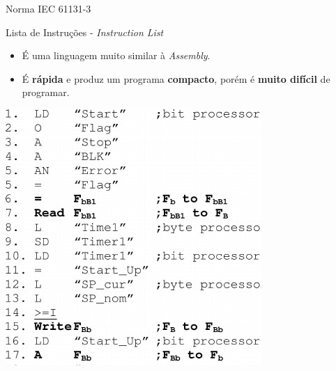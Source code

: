 \begin{frame}{Norma IEC 61131-3}
	\begin{block}{Lista de Instruções - \textit{Instruction List}}
		\begin{itemize}
			\item É uma linguagem muito similar à \textit{Assembly}.
			\item É \textbf{rápida} e produz um programa \textbf{compacto}, porém é \textbf{muito difícil} de programar.
		\end{itemize}
	\end{block}

	\centering
	
	\includegraphics[height=0.6\textheight]{Figuras/Ch10/fig2}
\end{frame}


